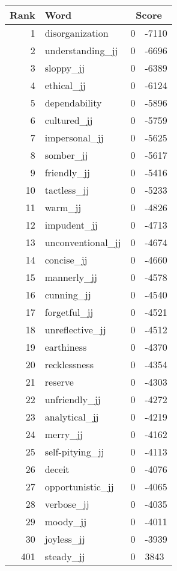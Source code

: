\begin{longtable}[!htbp]{| rlr@{.}l |}
    \hline
    \textbf{Rank} & \textbf{Word} & \multicolumn{2}{c|}{\textbf{Score}} \\
    \hline
    \endhead
    1 & disorganization & 0 & -7110 \\
    2 & understanding\_jj & 0 & -6696 \\
    3 & sloppy\_jj & 0 & -6389 \\
    4 & ethical\_jj & 0 & -6124 \\
    5 & dependability & 0 & -5896 \\
    6 & cultured\_jj & 0 & -5759 \\
    7 & impersonal\_jj & 0 & -5625 \\
    8 & somber\_jj & 0 & -5617 \\
    9 & friendly\_jj & 0 & -5416 \\
    10 & tactless\_jj & 0 & -5233 \\
    11 & warm\_jj & 0 & -4826 \\
    12 & impudent\_jj & 0 & -4713 \\
    13 & unconventional\_jj & 0 & -4674 \\
    14 & concise\_jj & 0 & -4660 \\
    15 & mannerly\_jj & 0 & -4578 \\
    16 & cunning\_jj & 0 & -4540 \\
    17 & forgetful\_jj & 0 & -4521 \\
    18 & unreflective\_jj & 0 & -4512 \\
    19 & earthiness & 0 & -4370 \\
    20 & recklessness & 0 & -4354 \\
    21 & reserve & 0 & -4303 \\
    22 & unfriendly\_jj & 0 & -4272 \\
    23 & analytical\_jj & 0 & -4219 \\
    24 & merry\_jj & 0 & -4162 \\
    25 & self-pitying\_jj & 0 & -4113 \\
    26 & deceit & 0 & -4076 \\
    27 & opportunistic\_jj & 0 & -4065 \\
    28 & verbose\_jj & 0 & -4035 \\
    29 & moody\_jj & 0 & -4011 \\
    30 & joyless\_jj & 0 & -3939 \\
    401 & steady\_jj & 0 & 3843 \\

\end{longtable}
